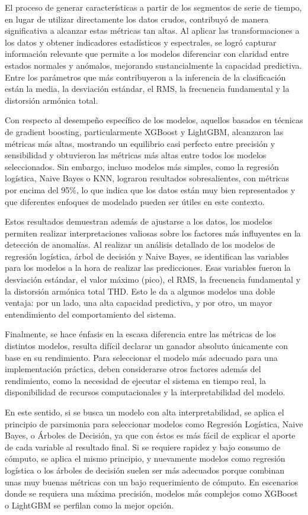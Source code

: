 \documentclass[11pt,a4paper,spanish]{book}
\numberwithin{equation}{chapter}
\numberwithin{figure}{chapter}
\begin{document}
El proceso de generar características a partir de los segmentos de serie de tiempo, 
en lugar de utilizar directamente los datos crudos, contribuyó de manera significativa 
a alcanzar estas métricas tan altas. Al aplicar las transformaciones a los datos y 
obtener indicadores estadísticos y espectrales, se logró capturar información relevante 
que permite a los modelos diferenciar con claridad entre estados normales y anómalos, 
mejorando sustancialmente la capacidad predictiva. Entre los parámetros que más 
contribuyeron a la inferencia de la clasificación están la media, la desviación estándar, 
el RMS, la frecuencia fundamental y la distorsión armónica total.


Con respecto al desempeño específico de los modelos, aquellos basados en técnicas de 
gradient boosting, particularmente XGBoost y LightGBM, alcanzaron las métricas más altas, 
mostrando un equilibrio casi perfecto entre precisión y sensibilidad y obtuvieron las 
métricas más altas entre todos los modelos seleccionados. Sin embargo, incluso modelos 
más simples, como la regresión logística, Naive Bayes o KNN, lograron resultados 
sobresalientes, con métricas por encima del 95\%, lo que indica que los datos están muy 
bien representados y que diferentes enfoques de modelado pueden ser útiles en este 
contexto.


Estos resultados demuestran además de ajustarse a los datos, los modelos permiten 
realizar interpretaciones valiosas sobre los factores más influyentes en la detección 
de anomalías. 
Al realizar un análisis detallado de los modelos de regresión logística, árbol de 
decisión y Naive Bayes, se identifican las variables para los modelos a la hora de 
realizar las predicciones. Esas variables fueron la desviación estándar, el valor 
máximo (pico), el RMS, la frecuencia fundamental y la distorsión armónica total THD. 
Esto le da a algunos modelos una doble ventaja: por un lado, una alta capacidad 
predictiva, y por otro, un mayor entendimiento del comportamiento del sistema.


Finalmente, se hace énfasis en la escasa diferencia entre las métricas de los distintos
modelos, resulta difícil declarar un ganador absoluto únicamente con base en su 
rendimiento. 
Para seleccionar el modelo más adecuado para una implementación práctica, deben 
considerarse otros factores además del rendimiento, como la necesidad de ejecutar el 
sistema en tiempo real, la disponibilidad de recursos computacionales y la 
interpretabilidad del modelo. 


En este sentido,  si se busca un modelo con alta interpretabilidad, se aplica el 
principio de parsimonia para seleccionar modelos como Regresión Logística, Naive Bayes,
o Árboles de Decisión, ya que con éstos es  más fácil de explicar el aporte de cada 
variable al  resultado final.  
Si se requiere rapidez y bajo consumo de cómputo, se aplica el mismo principio, y 
nuevamente modelos como regresión logística o los árboles de decisión suelen ser más 
adecuados porque combinan unas muy buenas métricas con un bajo requerimiento de cómputo.
En escenarios donde se requiera una máxima precisión, modelos más complejos como 
XGBoost o LightGBM se perfilan como la mejor opción.
\end{document}

